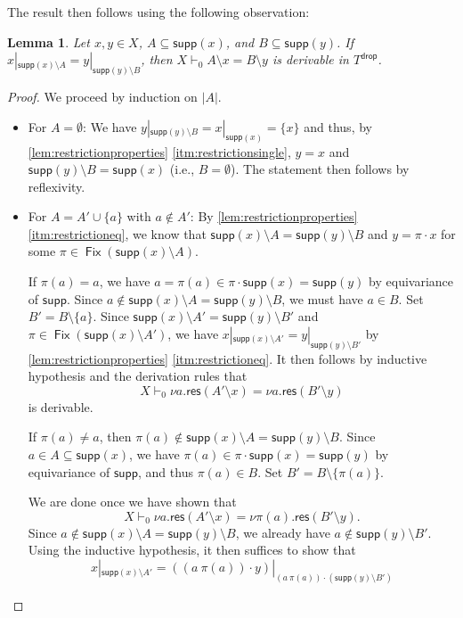 \documentclass[11pt,a4paper]{amsart}
\newtheorem{lemma}[lemma]{Lemma}
\newcommand{\res}{\mathsf{res}}
\newcommand{\drop}{\mathsf{drop}}
\newcommand{\supp}{\mathsf{supp}}
\newcommand{\Fix}{\mathop{\mathsf{Fix}}}
\theoremstyle{plain}
\numberwithin{equation}{section}
\newcommand{\+}[1]{\mathcal{#1}\xspace}
\theoremstyle{definition}
\begin{document}
The result then follows using the following observation:
\begin{lemma}
  Let $x, y \in X$, $A \subseteq \supp(x)$, and $B \subseteq \supp(y)$.
  If $x|_{\supp(x) \setminus A} = y|_{\supp(y) \setminus B}$, then $X \vdash_0 A \setminus x = B \setminus y$ is derivable in $T^\drop$.
\end{lemma}
\begin{proof}
  We proceed by induction on $|A|$.
  \begin{itemize}
    \item
      For $A = \emptyset$:
      We have $y|_{\supp(y) \setminus B} = x|_{\supp(x)} = \{x\}$ and thus, by \cref{lem:restrictionproperties} \eqref{itm:restrictionsingle}, $y = x$ and $\supp(y) \setminus B = \supp(x)$ (i.e., $B = \emptyset$).
      The statement then follows by reflexivity.
    \item
      For $A = A' \cup \{a\}$ with $a\notin A'$: %
      By \cref{lem:restrictionproperties} \eqref{itm:restrictioneq}, we know that $\supp(x) \setminus A = \supp(y) \setminus B$ and $y = \pi \cdot x$ for some $\pi \in \Fix(\supp(x) \setminus A)$.

      If $\pi(a) = a$, we have $a = \pi(a) \in \pi \cdot \supp(x) = \supp(y)$ by equivariance of $\supp$.
      Since $a \notin \supp(x) \setminus A = \supp(y) \setminus B$, we must have $a \in B$.
      Set $B' = B \setminus \{a\}$.
      Since $\supp(x) \setminus A' = \supp(y) \setminus B'$ and $\pi \in \Fix(\supp(x) \setminus A')$, we have $x|_{\supp(x) \setminus A'} = y|_{\supp(y) \setminus B'}$ by \cref{lem:restrictionproperties} \eqref{itm:restrictioneq}.
      It then follows by inductive hypothesis and the derivation rules that
      \begin{equation*}
        X \vdash_0 \nu a.\res(A' \setminus x) = \nu a.\res(B' \setminus y)
      \end{equation*}
      is derivable.

      If $\pi(a) \neq a$, then $\pi(a) \notin \supp(x) \setminus A = \supp(y) \setminus B$.
      Since $a \in A \subseteq \supp(x)$, we have $\pi(a) \in \pi \cdot \supp(x) = \supp(y)$ by equivariance of $\supp$, and thus $\pi(a) \in B$.
      Set $B' = B \setminus \{\pi(a)\}$.

      We are done once we have shown that
      \begin{equation*}
        X \vdash_0 \nu a.\res(A' \setminus x) = \nu \pi(a).\res(B' \setminus y).
      \end{equation*}
      Since $a \notin \supp(x) \setminus A = \supp(y) \setminus B$, we already have $a \notin \supp(y) \setminus B'$.
      Using the inductive hypothesis, it then suffices to show that
      \begin{equation*}
        x|_{\supp(x) \setminus A'} = ((a\ \pi(a)) \cdot y)|_{(a\ \pi(a)) \cdot (\supp(y) \setminus B')}
      \end{equation*}


\end{itemize}
\end{proof}
\end{document}

